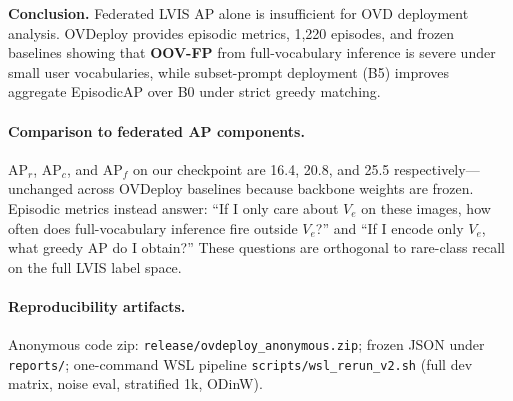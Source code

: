 \documentclass[10pt,twocolumn,letterpaper]{article}
\begin{document}
\textbf{Conclusion.} Federated LVIS AP alone is insufficient for OVD deployment analysis.
OVDeploy provides episodic metrics, 1,220 episodes, and frozen baselines showing that \textbf{OOV-FP} from full-vocabulary inference is severe under small user vocabularies, while subset-prompt deployment (B5) improves aggregate EpisodicAP over B0 under strict greedy matching.

\paragraph{Comparison to federated AP components.}
AP$_r$, AP$_c$, and AP$_f$ on our checkpoint are 16.4, 20.8, and 25.5 respectively---unchanged across OVDeploy baselines because backbone weights are frozen.
Episodic metrics instead answer: ``If I only care about $V_e$ on these images, how often does full-vocabulary inference fire outside $V_e$?'' and ``If I encode only $V_e$, what greedy AP do I obtain?''
These questions are orthogonal to rare-class recall on the full LVIS label space.

\paragraph{Reproducibility artifacts.}
Anonymous code zip: \texttt{release/ovdeploy\_anonymous.zip}; frozen JSON under \texttt{reports/}; one-command WSL pipeline \texttt{scripts/wsl\_rerun\_v2.sh} (full dev matrix, noise eval, stratified 1k, ODinW).

{\small


}
\end{document}

